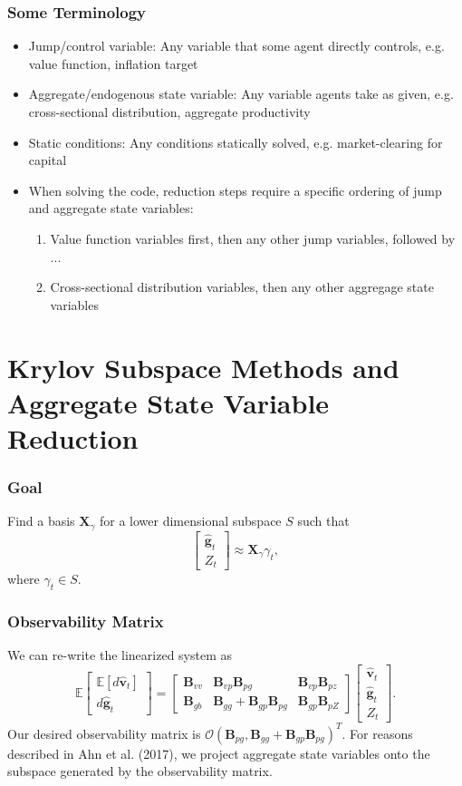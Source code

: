 \documentclass{beamer}
\newcommand{\bfg}{\mathbf{g}}
\newcommand{\bfv}{\mathbf{v}}
\newcommand{\bfX}{\mathbf{X}}
\newcommand{\bfB}{\mathbf{B}}
\newcommand{\E}{\mathbb{E}}
\newcommand{\Z}{\mathbb{Z}}
\newcommand{\calO}{\mathcal{O}}
\begin{document}
  \begin{frame}
    \frametitle{Some Terminology}
    \begin{itemize}
    \item Jump/control variable: Any variable that some agent directly controls, e.g. value function, inflation target
    \item Aggregate/endogenous state variable: Any variable agents take as given, e.g. cross-sectional distribution, aggregate productivity
    \item Static conditions: Any conditions statically solved, e.g. market-clearing for capital
    \item When solving the code, reduction steps require a specific ordering of jump and aggregate state variables:
      \begin{enumerate}
      \item Value function variables first, then any other jump variables, followed by ...
      \item Cross-sectional distribution variables, then any other aggregage state variables
      \end{enumerate}
    \end{itemize}
\end{frame}

\section{Krylov Subspace Methods and Aggregate State Variable Reduction}

\begin{frame}
\frametitle{Goal}
Find a basis $\bfX_\gamma$ for a lower dimensional subspace $S$ such that
\[
\begin{bmatrix}
  \hat{\bfg}_t\\Z_t
\end{bmatrix} \approx \bfX_\gamma \gamma_t,
\]
where $\gamma_t\in S$.
\end{frame}

\begin{frame}
  \frametitle{Observability Matrix}
We can re-write the linearized system as
\[ \E \begin{bmatrix}
    \E[d\hat{\bfv}_t]\\d\hat{\bfg}_t
  \end{bmatrix} =
  \begin{bmatrix}
    \bfB_{vv} & \bfB_{vp} \bfB_{pg} & \bfB_{vp}\bfB_{pz}\\
    \bfB_{gb} & \bfB_{gg} + \bfB_{gp}\bfB_{pg} & \bfB_{gp} \bfB_{pZ}
  \end{bmatrix}
  \begin{bmatrix}
    \hat{\bfv}_t\\\hat{\bfg}_t\\ Z_t
  \end{bmatrix}.
\]
Our desired observability matrix is $\calO(\bfB_{pg}, \bfB_{gg} + \bfB_{gp}\bfB_{pg})^T$. For reasons described in Ahn et al. (2017), we project aggregate state variables onto the subspace generated by the observability matrix.
\end{frame}
\end{document}
